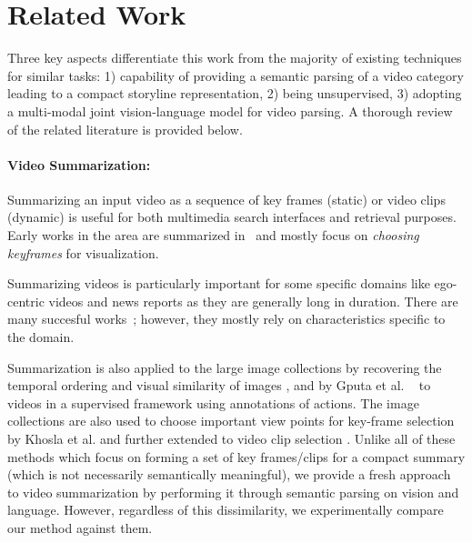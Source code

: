 \section{Related Work}
Three key aspects differentiate this work from the majority of existing techniques for similar tasks: 1) capability of providing a semantic parsing of a video category leading to a compact storyline representation, 2) being unsupervised, 3) adopting a multi-modal joint vision-language model for video parsing. A thorough review of the related literature is provided below.

\paragraph{Video Summarization:}
Summarizing an input video as a sequence of key frames (static) or video clips (dynamic) is useful for both multimedia search interfaces and retrieval purposes. Early works in the area are summarized in~\cite{vidAbstraction} and mostly focus on \emph{choosing keyframes} for visualization. 

Summarizing videos is particularly important for some specific domains like ego-centric videos and news reports as they are generally long in duration. There are many succesful works~\cite{lee2012discovering, lu2013story,rui2000automatically}; however, they mostly rely on characteristics specific to the domain.

Summarization is also applied to the large image collections by recovering the temporal ordering and visual similarity of images \cite{storyGraph}, and by Gputa et al. ~\cite{gupta2009understanding} to videos in a supervised framework using annotations of actions. The image collections are also used to choose important view points for key-frame selection by Khosla et al.\cite{khosla2013large} and further extended to video clip selection \cite{kim2014joint,potapov2014category}. Unlike all of these methods which  focus on forming a set of key frames/clips for a compact summary (which is not necessarily semantically meaningful), we provide a fresh approach to video summarization by performing it through semantic parsing on vision and language. However, regardless of this dissimilarity, we experimentally compare our method against them.

